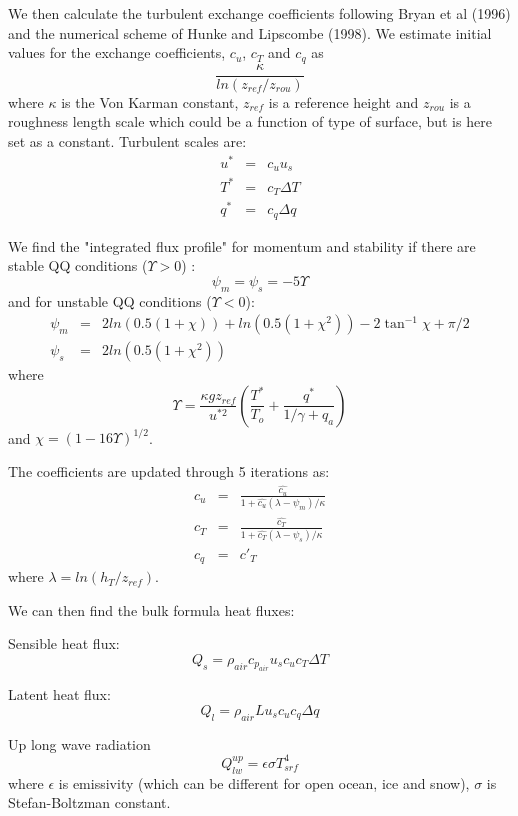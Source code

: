 We then calculate the turbulent exchange coefficients
following Bryan et al (1996) and the numerical scheme
of Hunke and Lipscombe (1998). 
We estimate initial values for the exchange coefficients, $c_u$,
$c_T$ and $c_q$ as
\[
\frac{\kappa}{ln(z_{ref}/z_{rou})}
\]
where $\kappa$ is the Von Karman constant, $z_{ref}$ is a
reference height and $z_{rou}$ is a roughness length scale
which could be a function of type of surface, but is here set
as a constant. Turbulent scales are:
\begin{eqnarray}
u^* & = & c_u u_s \nonumber\\
T^* & = & c_T \Delta T \nonumber\\
q^* & = & c_q \Delta q \nonumber
\end{eqnarray}

We find the "integrated flux profile" for momentum and stability
if there are stable QQ conditions ($\Upsilon>0$) :
\[
\psi_m = \psi_s = -5 \Upsilon
\]
and for unstable QQ conditions ($\Upsilon<0$):
\begin{eqnarray}
\psi_m & = & 2 ln(0.5(1+\chi)) + ln(0.5(1+\chi^2)) - 2 \tan^{-1} \chi + \pi/2
\nonumber \\
\psi_s & = & 2 ln(0.5(1+\chi^2)) \nonumber
\end{eqnarray}
where
\[
\Upsilon = \frac{\kappa g z_{ref}}{u^{*2}} (\frac{T^*}{T_o} + 
\frac{q^*}{1/\gamma + q_a})
\]
and $\chi=(1-16\Upsilon)^{1/2}$.

The coefficients are updated through 5 iterations as:
\begin{eqnarray}
c_u & = & \frac {\hat{c_u}}{1+\hat{c_u}(\lambda - \psi_m)/\kappa} \nonumber \\
c_T & = & \frac {\hat{c_T}}{1+\hat{c_T}(\lambda - \psi_s)/\kappa} \nonumber \\
c_q & = & c'_T
\end{eqnarray}
where $\lambda =ln(h_T/z_{ref})$.

We can then find the bulk formula heat fluxes:

\vspace{.2cm}
\noindent
Sensible heat flux:
\[
Q_s=\rho_{air} c_{p_{air}} u_s c_u c_T \Delta T
\]

\vspace{.2cm}
\noindent
Latent heat flux:
\[
Q_l=\rho_{air} L u_s c_u c_q \Delta q
\]

\vspace{.2cm}
\noindent
Up long wave radiation
\[
Q_{lw}^{up}=\epsilon \sigma T_{srf}^4
\]
where $\epsilon$ is emissivity (which can be different for
open ocean, ice and snow), $\sigma$ is Stefan-Boltzman constant.

